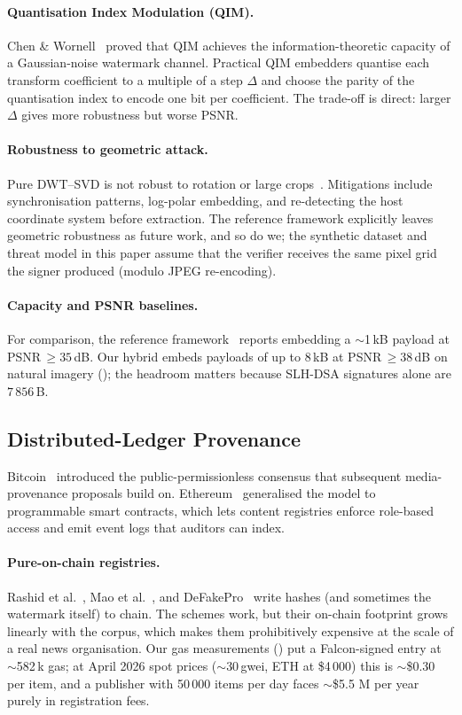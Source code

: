 \documentclass[11pt,a4paper]{article}
\theoremstyle{definition}
\theoremstyle{plain}
\theoremstyle{remark}
\begin{document}
\paragraph{Quantisation Index Modulation (QIM).}
Chen \& Wornell~\cite{bib39} proved that QIM achieves the
information-theoretic capacity of a Gaussian-noise watermark channel.
Practical QIM embedders quantise each transform coefficient to a
multiple of a step $\Delta$ and choose the parity of the quantisation
index to encode one bit per coefficient. The trade-off is direct:
larger $\Delta$ gives more robustness but worse PSNR.

\paragraph{Robustness to geometric attack.}
Pure DWT--SVD is not robust to rotation or large
crops~\cite{bib49}. Mitigations include synchronisation patterns,
log-polar embedding, and re-detecting the host coordinate system
before extraction. The reference framework explicitly leaves geometric
robustness as future work, and so do we; the synthetic dataset and
threat model in this paper assume that the verifier receives the same
pixel grid the signer produced (modulo JPEG re-encoding).

\paragraph{Capacity and PSNR baselines.}
For comparison, the reference framework~\cite{bib4} reports embedding
a $\sim$1\,kB payload at PSNR\,$\geq 35$\,dB. Our hybrid embeds
payloads of up to 8\,kB at PSNR\,$\geq 38$\,dB on natural imagery
(); the headroom matters because SLH-DSA signatures
alone are $7\,856$\,B.

\subsection{Distributed-Ledger Provenance}\label{sec:lit-chain}

Bitcoin~\cite{bib28} introduced the public-permissionless consensus
that subsequent media-provenance proposals build on.
Ethereum~\cite{bib29} generalised the model to programmable smart
contracts, which lets content registries enforce role-based access
and emit event logs that auditors can index.

\paragraph{Pure-on-chain registries.}
Rashid et al.~\cite{bib10}, Mao et al.~\cite{bib11}, and
DeFakePro~\cite{bib12} write hashes (and sometimes the watermark
itself) to chain. The schemes work, but their on-chain footprint grows
linearly with the corpus, which makes them prohibitively expensive at
the scale of a real news organisation. Our gas measurements
() put a Falcon-signed entry at $\sim$582\,k gas; at
April 2026 spot prices ($\sim$30\,gwei, ETH at \$4\,000) this is
$\sim$\$0.30 per item, and a publisher with 50\,000 items per day
faces $\sim$\$5.5 M per year purely in registration fees.
\end{document}
